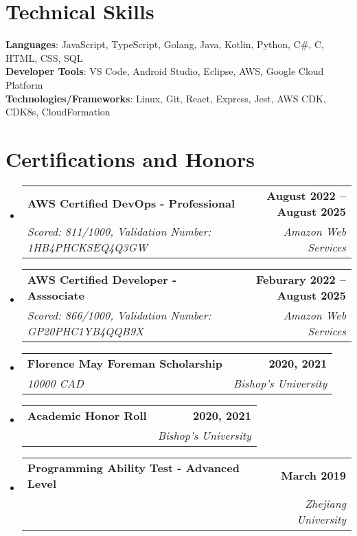 \documentclass[letterpaper,11pt]{article}
\makeatletter
\newcommand{\resumeItem}[1]{
  \item\small{
    {#1 \vspace{-2pt}}
  }
}
\newcommand{\resumeSubheading}[4]{
  \vspace{-2pt}\item
    \begin{tabular*}{1.0\textwidth}[t]{l@{\extracolsep{\fill}}r}
      \textbf{#1} & \textbf{\small #2} \\
      \textit{\small#3} & \textit{\small #4} \\
    \end{tabular*}\vspace{-7pt}
}
\newcommand{\resumeProjectHeading}[2]{
    \item
    \begin{tabular*}{1.001\textwidth}{l@{\extracolsep{\fill}}r}
      \small#1 & \textbf{\small #2}\\
    \end{tabular*}\vspace{-7pt}
}
\newcommand{\resumeSubHeadingListStart}{\begin{itemize}[leftmargin=0.0in, label={}]}
\newcommand{\resumeSubHeadingListEnd}{\end{itemize}}
\newcommand{\resumeItemListStart}{\begin{itemize}}
\newcommand{\resumeItemListEnd}{\end{itemize}\vspace{-5pt}}
\makeatother
\begin{document}

%
\section{Technical Skills}
 \begin{itemize}[leftmargin=0.15in, label={}]
    \small{\item{
     \textbf{Languages}{: JavaScript, TypeScript, Golang, Java, Kotlin, Python, C\#, C, HTML, CSS, SQL} \\
     \textbf{Developer Tools}{: VS Code, Android Studio, Eclipse, AWS, Google Cloud Platform} \\
     \textbf{Technologies/Frameworks}{: Linux, Git, React, Express, Jest, AWS CDK, CDK8s, CloudFormation} \\
    }}
 \end{itemize}
 \vspace{-16pt}


\section{Certifications and Honors}
    \resumeSubHeadingListStart
        \resumeSubheading{AWS Certified DevOps - Professional}{August 2022 -- August 2025}{Scored: 811/1000, Validation Number: 1HB4PHCKSEQ4Q3GW}{Amazon Web Services}
        \resumeSubheading{AWS Certified Developer - Asssociate}{Feburary 2022 -- August 2025}{Scored: 866/1000, Validation Number: GP20PHC1YB4QQB9X}{Amazon Web Services}
        \resumeSubheading{Florence May Foreman Scholarship}{2020, 2021}{10000 CAD}{Bishop's University}
        \resumeSubheading{Academic Honor Roll}{2020, 2021}{}{Bishop's University}
            \resumeSubheading{Programming Ability Test - Advanced Level}{March 2019}{}{Zhejiang University}
    \resumeSubHeadingListEnd
    
\end{document}
